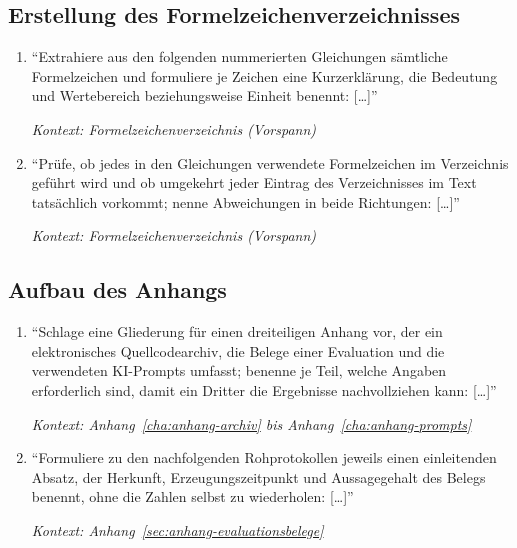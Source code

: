 \subsection{Erstellung des Formelzeichenverzeichnisses}
\label{sec:prompts-claude-formelzeichen}
\begin{enumerate}
    \item \enquote{Extrahiere aus den folgenden nummerierten Gleichungen
            sämtliche Formelzeichen und formuliere je Zeichen eine
            Kurzerklärung, die Bedeutung und Wertebereich beziehungsweise
            Einheit benennt: [\dots]}
            \par\hfill\textit{Kontext: Formelzeichenverzeichnis (Vorspann)}

    \item \enquote{Prüfe, ob jedes in den Gleichungen verwendete Formelzeichen
            im Verzeichnis geführt wird und ob umgekehrt jeder Eintrag des
            Verzeichnisses im Text tatsächlich vorkommt; nenne Abweichungen in
            beide Richtungen: [\dots]}
            \par\hfill\textit{Kontext: Formelzeichenverzeichnis (Vorspann)}
\end{enumerate}

\subsection{Aufbau des Anhangs}
\label{sec:prompts-claude-anhang}
\begin{enumerate}
    \item \enquote{Schlage eine Gliederung für einen dreiteiligen Anhang vor,
            der ein elektronisches Quellcodearchiv, die Belege einer
            Evaluation und die verwendeten KI-Prompts umfasst; benenne je
            Teil, welche Angaben erforderlich sind, damit ein Dritter die
            Ergebnisse nachvollziehen kann: [\dots]}
            \par\hfill\textit{Kontext: Anhang~\ref{cha:anhang-archiv} bis
            Anhang~\ref{cha:anhang-prompts}}

    \item \enquote{Formuliere zu den nachfolgenden Rohprotokollen jeweils
            einen einleitenden Absatz, der Herkunft, Erzeugungszeitpunkt und
            Aussagegehalt des Belegs benennt, ohne die Zahlen selbst zu
            wiederholen: [\dots]}
            \par\hfill\textit{Kontext:
            Anhang~\ref{sec:anhang-evaluationsbelege}}
\end{enumerate}

